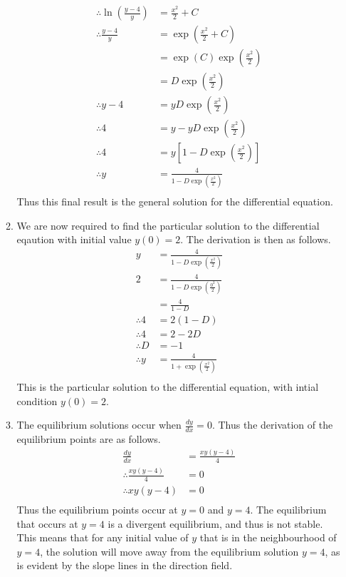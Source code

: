 \documentclass[a4paper]{article}
\begin{document}
\begin{enumerate}[label=\textbf{\arabic*.}]
\begin{enumerate}
\begin{align*}
		\therefore \ln{\left(\frac{y-4}{y} \right)} & = \frac{x^2}{2} + C\\
		\therefore \frac{y-4}{y} & = \exp(\frac{x^2}{2} + C)\\
		& = \exp(C)\exp(\frac{x^2}{2})\\
		& = D\exp(\frac{x^2}{2})\\
		\therefore y - 4 & = yD\exp(\frac{x^2}{2})\\
		\therefore 4 & = y - yD\exp(\frac{x^2}{2})\\
		\therefore 4 & = y\left[1 - D\exp(\frac{x^2}{2})\right]\\
		\therefore y & = \frac{4}{1 - D\exp(\frac{x^2}{2})}\\
		\end{align*}
		Thus this final result is the general solution for the differential equation.

		\bigbreak

		\item We are now required to find the particular solution to the differential eqaution with initial value $\displaystyle{y(0) = 2}$. The derivation is then as follows.
		\begin{align*}
		y & = \frac{4}{1 - D\exp(\frac{x^2}{2})}\\
		2 & = \frac{4}{1 - D\exp(\frac{0^2}{2})}\\
		& = \frac{4}{1 - D}\\
		\therefore 4 & = 2(1-D)\\
		\therefore 4 & = 2 - 2D\\
		\therefore D & = -1\\
		\therefore y & = \frac{4}{1 + \exp(\frac{x^2}{2})}\\
		\end{align*}
		This is the particular solution to the differential equation, with intial condition $\displaystyle{y(0) = 2}$.

		\pagebreak

		\item The equilibrium solutions occur when $\displaystyle{\frac{dy}{dx}=0}$. Thus the derivation of the equilibrium points are as follows.
		\begin{align*}
		\frac{dy}{dx} & = \frac{xy(y-4)}{4}\\
		\therefore \frac{xy(y-4)}{4} & = 0\\
		\therefore xy(y-4) & = 0\\
		\end{align*}
		Thus the equilibrium points occur at $\displaystyle{y=0}$ and $\displaystyle{y=4}$. The equilibrium that occurs at $\displaystyle{y=4}$ is a divergent equilibrium, and thus is not stable. This means that for any initial value of $\displaystyle{y}$ that is in the neighbourhood of $\displaystyle{y=4}$, the solution will move away from the equilibrium solution $\displaystyle{y=4}$, as is evident by the slope lines in the direction field.


\end{enumerate}
\end{enumerate}
\end{document}
